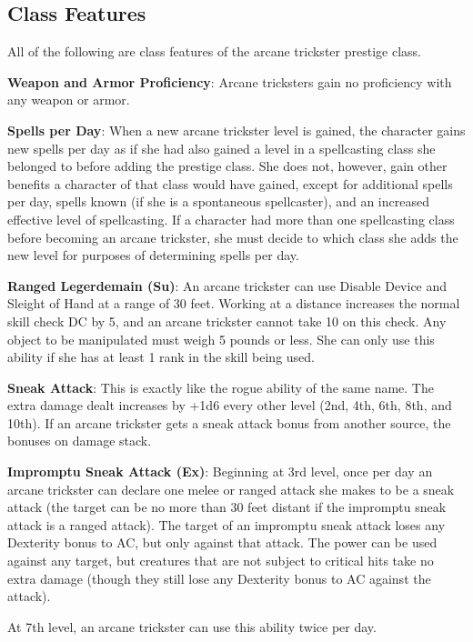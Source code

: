 \subsection{Class Features}

				
All of the following are class features of the arcane trickster prestige class.
				
\textbf{Weapon and Armor Proficiency}: Arcane tricksters gain no proficiency with any weapon or armor.
				
\textbf{Spells per Day}: When a new arcane trickster level is gained, the character gains new spells per day as if she had also gained a level in a spellcasting class she belonged to before adding the prestige class. She does not, however, gain other benefits a character of that class would have gained, except for additional spells per day, spells known (if she is a spontaneous spellcaster), and an increased effective level of spellcasting. If a character had more than one spellcasting class before becoming an arcane trickster, she must decide to which class she adds the new level for purposes of determining spells per day.
				
\textbf{Ranged Legerdemain (Su)}: An arcane trickster can use Disable Device and Sleight of Hand at a range of 30 feet. Working at a distance increases the normal skill check DC by 5, and an arcane trickster cannot take 10 on this check. Any object to be manipulated must weigh 5 pounds or less. She can only use this ability if she has at least 1 rank in the skill being used.
				
\textbf{Sneak Attack}: This is exactly like the rogue ability of the same name. The extra damage dealt increases by +1d6 every other level (2nd, 4th, 6th, 8th, and 10th). If an arcane trickster gets a sneak attack bonus from another source, the bonuses on damage stack.
				
\textbf{Impromptu Sneak Attack (Ex)}: Beginning at 3rd level, once per day an arcane trickster can declare one melee or ranged attack she makes to be a sneak attack (the target can be no more than 30 feet distant if the impromptu sneak attack is a ranged attack). The target of an impromptu sneak attack loses any Dexterity bonus to AC, but only against that attack. The power can be used against any target, but creatures that are not subject to critical hits take no extra damage (though they still lose any Dexterity bonus to AC against the attack).
				
At 7th level, an arcane trickster can use this ability twice per day.
				
